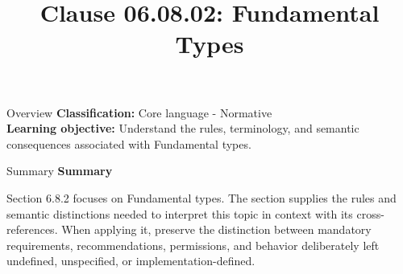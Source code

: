 \documentclass[10pt,letterpaper]{article}
\title{Clause 06.08.02: Fundamental Types}
\author{}
\date{}
\begin{document}
\maketitle
\begin{CornellOverviewBox}{Overview}
\textbf{Classification:} Core language - Normative\\[2pt]
\textbf{Learning objective:} Understand the rules, terminology, and semantic consequences associated with Fundamental types.
\end{CornellOverviewBox}\begin{CornellSummaryBox}{Summary}
{\sffamily\bfseries\color{Accent} Summary}\par\vspace{3pt}Section 6.8.2 focuses on Fundamental types. The section supplies the rules and semantic distinctions needed to interpret this topic in context with its cross-references. When applying it, preserve the distinction between mandatory requirements, recommendations, permissions, and behavior deliberately left undefined, unspecified, or implementation-defined.
\end{CornellSummaryBox}
\end{document}
